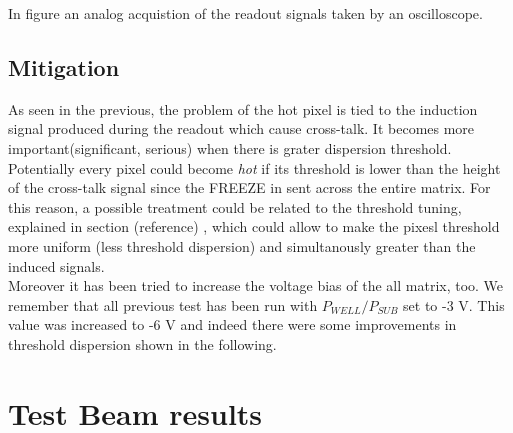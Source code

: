 In figure %
an analog acquistion of the readout signals taken by an oscilloscope.





\subsection{Mitigation}

As seen in the previous, the problem of the hot pixel is tied to the induction signal produced during the readout which cause cross-talk. It becomes more important(significant, serious) when there is grater dispersion threshold.\\

Potentially every pixel could become \textit{hot} if its threshold is lower than the height of the cross-talk signal since the \textsc{FREEZE} in sent across the entire matrix. 
For this reason, a possible treatment could be related to the threshold tuning, explained in section (reference) , which could allow to make the pixesl threshold more uniform (less threshold dispersion) and simultanously greater than the induced signals. \\


Moreover it has been tried to increase the voltage bias of the all matrix, too. We remember that all previous test has been run with $P_{WELL}/P_{SUB}$ set to -3 V. This value was increased to -6 V and indeed there were some improvements in threshold dispersion shown in the following. 




\section{Test Beam results}

